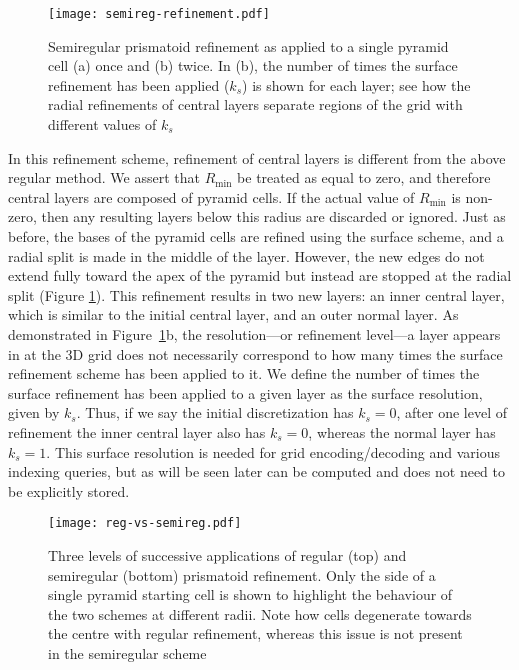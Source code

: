 \begin{figure}[ht!]
	\centering
	\texttt{[image: semireg-refinement.pdf]}
	\caption[Semiregular prismatoid refinement]{
		Semiregular prismatoid refinement as applied to a single pyramid cell (a) once and (b) twice.
		In (b), the number of times the surface refinement has been applied ($k_s$) is shown for each layer; see how the radial refinements of central layers separate regions of the grid with different values of $k_s$}
	\label{fig:semiregular}
\end{figure}


In this refinement scheme, refinement of central layers is different from the above regular method.
We assert that $R_\mathrm{min}$ be treated as equal to zero, and therefore central layers are composed of pyramid cells.
If the actual value of $R_\mathrm{min}$ is non-zero, then any resulting layers below this radius are discarded or ignored.
Just as before, the bases of the pyramid cells are refined using the surface scheme, and a radial split is made in the middle of the layer.
However, the new edges do not extend fully toward the apex of the pyramid but instead are stopped at the radial split (Figure \ref{fig:semiregular}).
This refinement results in two new layers: an inner central layer, which is similar to the initial central layer, and an outer normal layer.
As demonstrated in Figure~\ref{fig:semiregular}b, the resolution---or refinement level---a layer appears in at the 3D grid does not necessarily correspond to how many times the surface refinement scheme has been applied to it.
We define the number of times the surface refinement has been applied to a given layer as the surface resolution, given by $k_s$.
Thus, if we say the initial discretization has $k_s = 0$, after one level of refinement the inner central layer also has $k_s = 0$, whereas the normal layer has $k_s = 1$.
This surface resolution is needed for grid encoding/decoding and various indexing queries, but as will be seen later can be computed and does not need to be explicitly stored.


\begin{figure}[ht!]
	\centering
	\texttt{[image: reg-vs-semireg.pdf]}
	\caption[Comparison of regular and semiregular prismatoid refinement]{
		Three levels of successive applications of regular (top) and semiregular (bottom) prismatoid refinement.
		Only the side of a single pyramid starting cell is shown to highlight the behaviour of the two schemes at different radii.
		Note how cells degenerate towards the centre with regular refinement, whereas this issue is not present in the semiregular scheme
	}
	\label{fig:reg-vs-semireg}
\end{figure}


